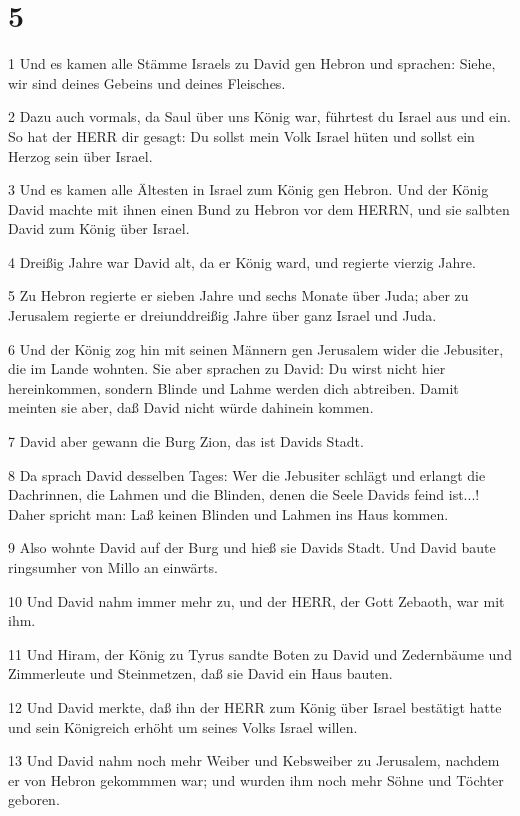\chapter{5}

\par 1 Und es kamen alle Stämme Israels zu David gen Hebron und sprachen: Siehe, wir sind deines Gebeins und deines Fleisches.
\par 2 Dazu auch vormals, da Saul über uns König war, führtest du Israel aus und ein. So hat der HERR dir gesagt: Du sollst mein Volk Israel hüten und sollst ein Herzog sein über Israel.
\par 3 Und es kamen alle Ältesten in Israel zum König gen Hebron. Und der König David machte mit ihnen einen Bund zu Hebron vor dem HERRN, und sie salbten David zum König über Israel.
\par 4 Dreißig Jahre war David alt, da er König ward, und regierte vierzig Jahre.
\par 5 Zu Hebron regierte er sieben Jahre und sechs Monate über Juda; aber zu Jerusalem regierte er dreiunddreißig Jahre über ganz Israel und Juda.
\par 6 Und der König zog hin mit seinen Männern gen Jerusalem wider die Jebusiter, die im Lande wohnten. Sie aber sprachen zu David: Du wirst nicht hier hereinkommen, sondern Blinde und Lahme werden dich abtreiben. Damit meinten sie aber, daß David nicht würde dahinein kommen.
\par 7 David aber gewann die Burg Zion, das ist Davids Stadt.
\par 8 Da sprach David desselben Tages: Wer die Jebusiter schlägt und erlangt die Dachrinnen, die Lahmen und die Blinden, denen die Seele Davids feind ist...! Daher spricht man: Laß keinen Blinden und Lahmen ins Haus kommen.
\par 9 Also wohnte David auf der Burg und hieß sie Davids Stadt. Und David baute ringsumher von Millo an einwärts.
\par 10 Und David nahm immer mehr zu, und der HERR, der Gott Zebaoth, war mit ihm.
\par 11 Und Hiram, der König zu Tyrus sandte Boten zu David und Zedernbäume und Zimmerleute und Steinmetzen, daß sie David ein Haus bauten.
\par 12 Und David merkte, daß ihn der HERR zum König über Israel bestätigt hatte und sein Königreich erhöht um seines Volks Israel willen.
\par 13 Und David nahm noch mehr Weiber und Kebsweiber zu Jerusalem, nachdem er von Hebron gekommmen war; und wurden ihm noch mehr Söhne und Töchter geboren.
